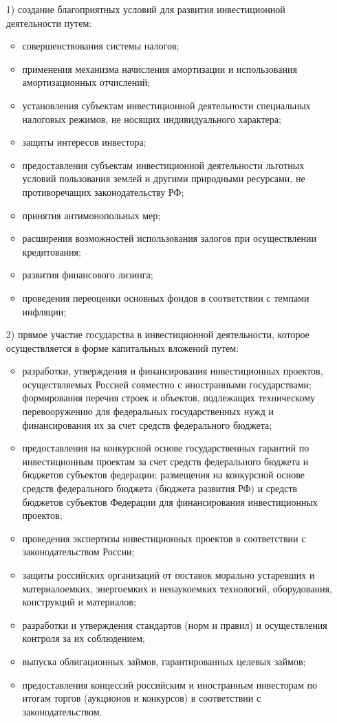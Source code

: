 \begin{enumerate}
	\item [1)] создание благоприятных условий для развития инвестиционной деятельности путем:

\begin{itemize}
	\item совершенствования системы налогов;
\item применения механизма начисления амортизации и использования амортизационных отчислений;
\item установления субъектам инвестиционной деятельности специальных налоговых режимов, не носящих индивидуального характера;
\item защиты интересов инвестора;
\item предоставления субъектам инвестиционной деятельности льготных условий пользования землей и другими природными ресурсами, не противоречащих законодательству РФ;
\item принятия антимонопольных мер;
\item расширения возможностей использования залогов при осуществлении кредитования;
\item развития финансового лизинга;
\item проведения переоценки основных фондов в соответствии с темпами инфляции;
\end{itemize}
\item [2)] прямое участие государства в инвестиционной деятельности, которое осуществляется в форме капитальных вложений путем: 
\begin{itemize}
	\item разработки, утверждения и финансирования инвестиционных проектов, осуществляемых Россией совместно с иностранными государствами; 
формирования перечня строек и объектов, подлежащих техническому перевооружению для федеральных государственных нужд и финансирования их за счет средств федерального бюджета; 
\item предоставления на конкурсной основе государственных гарантий по инвестиционным проектам за счет средств федерального бюджета и бюджетов субъектов федерации; размещения на конкурсной основе средств федерального бюджета (бюджета развития РФ) и средств бюджетов субъектов Федерации для финансирования инвестиционных проектов; 
\item проведения экспертизы инвестиционных проектов в соответствии с законодательством России; 
\item защиты российских организаций от поставок морально устаревших и материалоемких, энергоемких и ненаукоемких технологий, оборудования, конструкций и материалов; 
\item разработки и утверждения стандартов (норм и правил) и осуществления контроля за их соблюдением; 
\item выпуска облигационных займов, гарантированных целевых займов; 
\item предоставления концессий российским и иностранным инвесторам по итогам торгов (аукционов и конкурсов) в соответствии с законодательством.
\end{itemize}
\end{enumerate}

